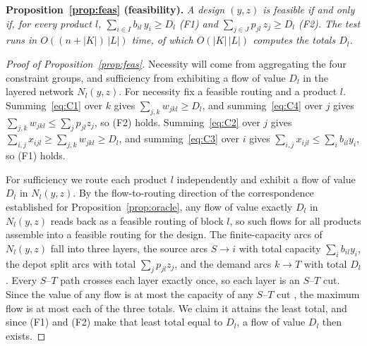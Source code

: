 \medskip\noindent
\textbf{Proposition~\ref{prop:feas} (feasibility).}
\emph{A design $(y,z)$ is feasible if and only if, for every product $l$,
$\sum_{i\in I}b_{il}\,y_i\ge D_l$ (F1) and
$\sum_{j\in J}p_{jl}\,z_j\ge D_l$ (F2). The test runs in
$O((n+|K|)\,|L|)$ time, of which $O(|K|\,|L|)$ computes the totals
$D_l$.}

\begin{proof}[Proof of Proposition~\ref{prop:feas}]
Necessity will come from aggregating the four constraint groups, and
sufficiency from exhibiting a flow of value $D_l$ in the layered network
$N_l(y,z)$. For necessity fix a feasible routing
and a product $l$.
Summing~\eqref{eq:C1} over $k$ gives $\sum_{j,k}w_{jkl}\ge D_l$, and
summing~\eqref{eq:C4} over $j$ gives
$\sum_{j,k}w_{jkl}\le\sum_j p_{jl}z_j$, so (F2) holds.
Summing~\eqref{eq:C2} over $j$ gives
$\sum_{i,j}x_{ijl}\ge\sum_{j,k}w_{jkl}\ge D_l$, and
summing~\eqref{eq:C3} over $i$ gives
$\sum_{i,j}x_{ijl}\le\sum_i b_{il}y_i$, so (F1) holds.

For sufficiency we route each product $l$ independently and exhibit a flow
of value $D_l$ in $N_l(y,z)$. By the flow-to-routing direction of the
correspondence established for Proposition~\ref{prop:oracle}, any flow of value exactly
$D_l$ in $N_l(y,z)$ reads back as a feasible routing of block $l$, so such
flows for all products assemble into a feasible routing for the design.
The finite-capacity arcs of $N_l(y,z)$ fall into three layers, the source
arcs $S\!\to\! i$ with total capacity $\sum_i b_{il}y_i$, the depot split
arcs with total $\sum_j p_{jl}z_j$, and the demand arcs $k\!\to\! T$ with
total $D_l$. Every $S$--$T$ path crosses each layer exactly once, so each
layer is an $S$--$T$ cut. Since the value of any flow is at most the
capacity of any $S$--$T$ cut \citep{Schrijver1986}, the maximum flow is
at most each of the three totals. We claim it attains the least total,
and since (F1) and (F2) make that least total equal to $D_l$, a flow of
value $D_l$ then exists.


\end{proof}
